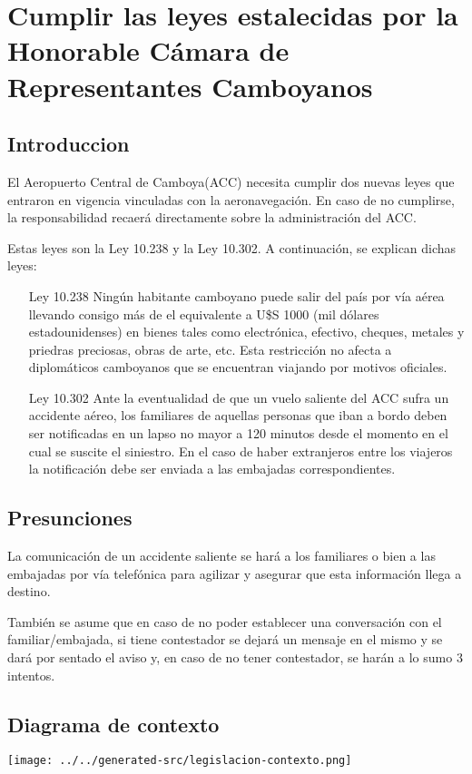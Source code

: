 \section{Cumplir las leyes estalecidas por la Honorable Cámara de Representantes Camboyanos}
\subsection{Introduccion}
El Aeropuerto Central de Camboya(ACC) necesita cumplir dos nuevas leyes que entraron en vigencia vinculadas con la aeronavegación. En caso de no cumplirse, la responsabilidad recaerá directamente sobre la administración del ACC.

Estas leyes son la Ley 10.238 y la Ley 10.302. A continuación, se explican dichas leyes:
\begin{enumerate}
  \item[Ley 10.238] Ningún habitante camboyano puede salir del país por vía aérea llevando consigo más de el equivalente a U\$S 1000 (mil dólares estadounidenses) en bienes tales como electrónica, efectivo, cheques, metales y priedras preciosas, obras de arte, etc. Esta restricción no afecta a diplomáticos camboyanos que se encuentran viajando por motivos oficiales.
  \item[Ley 10.302] Ante la eventualidad de que un vuelo saliente del ACC sufra un accidente aéreo, los familiares de aquellas personas que iban a bordo deben ser notificadas en un lapso no mayor a 120 minutos desde el momento en el cual se suscite el siniestro. En el caso de haber extranjeros entre los viajeros la notificación debe ser enviada a las embajadas correspondientes.
\end{enumerate}

\subsection{Presunciones}
La comunicación de un accidente saliente se hará a los familiares o bien a las embajadas por vía telefónica para agilizar y asegurar que esta información llega a destino.

También se asume que en caso de no poder establecer una conversación con el familiar/embajada, si tiene contestador se dejará un mensaje en el mismo y se dará por sentado el aviso y, en caso de no tener contestador, se harán a lo sumo 3 intentos.

\subsection{Diagrama de contexto}
\texttt{[image: ../../generated-src/legislacion-contexto.png]}

